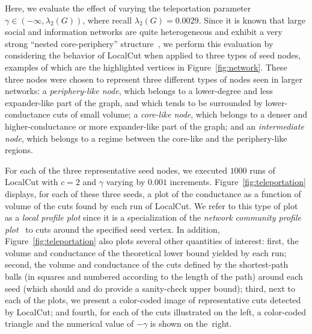 \documentclass[11pt]{article}
\begin{document}
Here, we evaluate the effect of varying the teleportation parameter 
$\gamma \in (-\infty,\lambda_2(G))$, where recall $\lambda_2(G) = 0.0029$.
Since it is known that large social and information networks are quite 
heterogeneous and exhibit a very strong ``nested core-periphery'' 
structure~\cite{LLDM08_communities_CONF,LLDM09_communities_IM,LLM10_communities_CONF}, 
we perform this evaluation by considering the behavior of \textsf{LocalCut} 
when applied to three types of seed nodes, examples of which are the 
highlighted vertices in Figure~\ref{fig:network}.
These three nodes were chosen to represent three different types of nodes
seen in larger networks: 
a \textit{periphery-like node}, which belongs to a lower-degree and less 
expander-like part of the graph, and which tends to be surrounded by 
lower-conductance cuts of small volume; 
a \textit{core-like node}, which belongs to a denser and higher-conductance 
or more expander-like part of the graph; and 
an \textit{intermediate node}, which belongs to a regime between the 
core-like and the periphery-like regions.

For each of the three representative seed nodes, we executed $1000$ runs of 
\textsf{LocalCut} with $c = 2$ and $\gamma$ varying by $0.001$ increments. 
Figure~\ref{fig:teleportation} displays, for each of these three seeds, a 
plot of the conductance as a function of volume of the cuts found by each 
run of \textsf{LocalCut}. 
We refer to this type of plot as a \textit{local profile plot} since it is 
a specialization of the \textit{network community profile plot}~\cite{LLDM08_communities_CONF,LLDM09_communities_IM,LLM10_communities_CONF} 
to cuts around the specified seed vertex.
In addition, Figure~\ref{fig:teleportation} also plots several other 
quantities of interest:
first, the volume and conductance of the theoretical lower bound yielded by 
each run; 
second, the volume and conductance of the cuts defined by the shortest-path 
balls (in squares and numbered according to the length of the path) around 
each seed (which should and do provide a sanity-check upper bound); 
third, next to each of the plots, we present a color-coded image of 
representative cuts detected by \textsf{LocalCut}; and 
fourth, for each of the cuts illustrated on the left, a color-coded triangle 
and the numerical value of $-\gamma$ is shown on the~right. 


\newcommand{\imscale}{.13}
\newcommand{\plscale}{.19}
\renewcommand{\imscale}{.2}
\renewcommand{\plscale}{.27}
\end{document}
